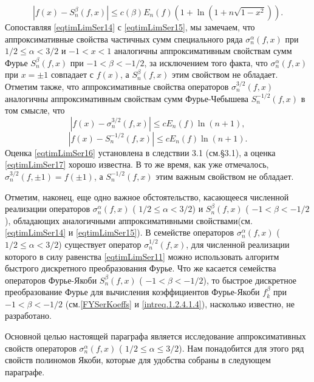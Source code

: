 \begin{equation}\label{eqtimLimSer15}%
|f(x)-S_n^\beta(f,x)|\le c(\beta)E_n(f)(1+\ln(1+n\sqrt{1-x^2})).
\end{equation}
Сопоставляя \eqref{eqtimLimSer14} с \eqref{eqtimLimSer15}, мы замечаем, что аппроксимативные свойства частичных сумм специального ряда $\sigma_n^\alpha(f,x)$ при $1/2\le \alpha <3/2$ и $-1<x<1$ аналогичны аппроксимативным свойствам сумм Фурье $S_n^\beta(f,x)$ при $-1<\beta <-1/2$, за исключением   того факта, что $\sigma_n^\alpha(f,x)$ при $x=\pm1$ совпадает с $f(x)$, а $S_n^\beta(f,x)$ этим свойством не обладает. Отметим также, что аппроксимативные свойства операторов $\sigma_n^{3/2}(f,x)$ аналогичны аппроксимативным свойствам сумм Фурье-Чебышева $S_n^{-1/2}(f,x)$ в том смысле, что
\begin{equation}\label{eqtimLimSer16}%
|f(x)-\sigma_n^{3/2}(f,x)|\le cE_n(f)\ln(n+1),
\end{equation}
\begin{equation}\label{eqtimLimSer17}%
|f(x)-S_n^{-1/2}(f,x)|\le cE_n(f)\ln(n+1).
\end{equation}
Оценка \eqref{eqtimLimSer16} установлена в следствии  3.1 (см.\S 3.1), а оценка \eqref{eqtimLimSer17} хорошо известна. В то же время, как уже отмечалось, $\sigma_n^{3/2}(f,\pm1)=f(\pm1)$, а $S_n^{-1/2}(f,x)$ этим важным свойством не обладает.

Отметим, наконец, еще одно важное обстоятельство, касающееся численной реализации операторов $\sigma_n^\alpha(f,x)$ ( $1/2 \le \alpha<3/2$)  и $S_n^\beta(f,x)$ ( $-1< \beta<-1/2$),  обладающих аналогичными аппроксимативными свойствами(см.\eqref{eqtimLimSer14} и \eqref{eqtimLimSer15}). В семействе операторов  $\sigma_n^\alpha(f,x)$ ( $1/2\le \alpha<3/2$) существует
оператор $\sigma_n^{1/2}(f,x)$, для численной реализации которого в силу равенства \eqref{eqtimLimSer11} можно использовать алгоритм быстрого дискретного преобразования Фурье. Что же касается семейства операторов Фурье-Якоби
$S_n^\beta(f,x)$ ( $-1< \beta<-1/2$), то быстрое дискретное  преобразование Фурье для вычисления коэффициентов Фурье-Якоби $f_k^\beta$ при $-1< \beta<-1/2$ (см.\eqref{FYSerKoeffs} и \eqref{intreq.1.2.4.1.4}), насколько известно, не разработано.

Основной целью настоящей параграфа является исследование аппроксимативных свойств операторов $\sigma_n^\alpha(f,x)$ ( $1/2\le \alpha\le3/2$). Нам понадобится для этого ряд свойств полиномов Якоби, которые для удобства собраны в следующем параграфе.



